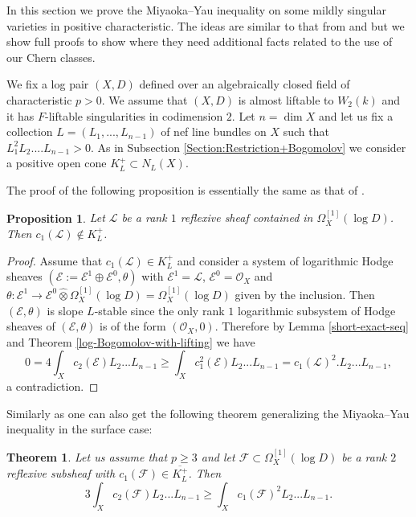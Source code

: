 \documentclass[12pt]{article}
\theoremstyle{plain}
\newtheorem{Theorem}[Thm]{\sc Theorem}
\newtheorem{Proposition}[Thm]{\sc Proposition}
\theoremstyle{definition}
\theoremstyle{remark}
\newcommand{\cE}{{\mathcal E}}
\newcommand{\cF}{{\mathcal F}}
\newcommand{\cL}{{\mathcal L}}
\newcommand{\cO}{{\mathcal O}}
\begin{document}
In this section we prove the Miyaoka--Yau inequality on some mildly singular varieties in positive characteristic. The ideas are similar to that from \cite{Si} and \cite{La4} but we show full proofs to show where they need additional facts related  to the use of our Chern classes.

\medskip

We fix a log pair $(X,D)$ defined over an algebraically closed field of characteristic $p>0$. We assume that $(X,D)$ is  almost liftable to $W_2(k)$ and it has $F$-liftable singularities in codimension $2$. Let $n=\dim X$ and let us fix a collection  $L=(L_1,...,L_{n-1})$ of nef line bundles on $X$ such that $L_1^2L_2....L_{n-1}>0$. As in  Subsection \ref{Section:Restriction+Bogomolov} we consider a positive open cone $K^+_L\subset N_L (X)$.


The proof of the following proposition is essentially the same as that of \cite[Proposition 4.1]{La4}.

\begin{Proposition}\label{log-Bogomolov's lemma}
	Let $\cL$ be a rank $1$ reflexive sheaf contained in
 $\Omega _X ^{[1]}(\log D)$. Then $c_1(\cL)\not \in K^{+}_L$.
\end{Proposition}

\begin{proof}
	Assume that $c_1(\cL)\in K^{+}_L$ and consider a system of logarithmic Hodge sheaves
	$(\cE:=\cE^1\oplus \cE^0, \theta )$ with $\cE^1=\cL$, $\cE^0=\cO _X$ and
	$\theta : \cE^1\to \cE^0\hat \otimes \Omega_X^{[1]}(\log D)= \Omega_X^{[1]}(\log D)$ given by the
	inclusion. Then $(\cE, \theta)$ is slope $L$-stable since the
	only rank $1$ logarithmic subsystem of Hodge sheaves of $(\cE, \theta)$ is of the form
	$(\cO _X, 0)$. Therefore by Lemma \ref{short-exact-seq} and Theorem \ref{log-Bogomolov-with-lifting}
	we have $$0=4\int_Xc_2(\cE)L_2...L_{n-1}\ge \int _X c_1^2(\cE)L_2...L_{n-1}=c_1(\cL)^2. L_2...L_{n-1},$$
	a contradiction. 
\end{proof}

Similarly as \cite[Theorem 4.4]{La4} one can also get the following theorem generalizing the Miyaoka--Yau inequality in the surface case:

\begin{Theorem}\label{logarithmic-Miyaoka-Yau-with-lift}
Let us assume that $p\ge 3$ and let $\cF\subset \Omega_X^{[1]}(\log D)$ be a rank $2$ reflexive subsheaf with $c_1(\cF)\in \overline{K^+_L}$.  Then 
$$ 3\int_Xc_2(\cF)L_2...L_{n-1}\ge \int_Xc_1(\cF)^2 L_2...L_{n-1} .$$
\end{Theorem}
\end{document}
